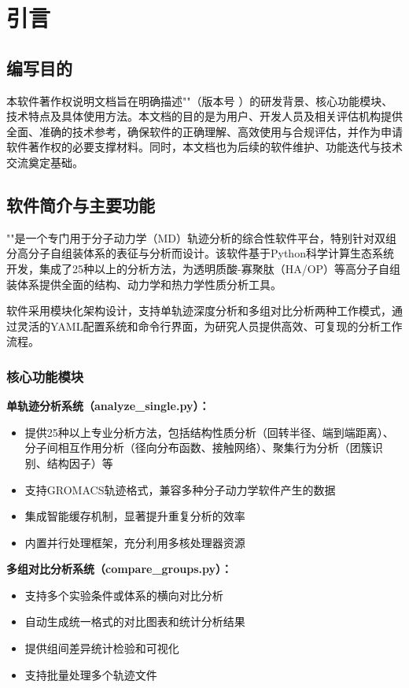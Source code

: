 
\section{引言}
\label{sec:introduction_main}

\subsection{编写目的}
\label{ssec:intro_purpose}
本软件著作权说明文档旨在明确描述"\Name"（版本号 \Version）的研发背景、核心功能模块、技术特点及具体使用方法。本文档的目的是为用户、开发人员及相关评估机构提供全面、准确的技术参考，确保软件的正确理解、高效使用与合规评估，并作为申请软件著作权的必要支撑材料。同时，本文档也为后续的软件维护、功能迭代与技术交流奠定基础。

\subsection{软件简介与主要功能}
\label{ssec:intro_summary_features}
"\Name"是一个专门用于分子动力学（MD）轨迹分析的综合性软件平台，特别针对双组分高分子自组装体系的表征与分析而设计。该软件基于Python科学计算生态系统开发，集成了25种以上的分析方法，为透明质酸-寡聚肽（HA/OP）等高分子自组装体系提供全面的结构、动力学和热力学性质分析工具。

软件采用模块化架构设计，支持单轨迹深度分析和多组对比分析两种工作模式，通过灵活的YAML配置系统和命令行界面，为研究人员提供高效、可复现的分析工作流程。

\subsubsection{核心功能模块}
\label{sssec:core_modules}

\textbf{单轨迹分析系统（analyze\_single.py）：}
\begin{itemize}
    \item 提供25种以上专业分析方法，包括结构性质分析（回转半径、端到端距离）、分子间相互作用分析（径向分布函数、接触网络）、聚集行为分析（团簇识别、结构因子）等
    \item 支持GROMACS轨迹格式，兼容多种分子动力学软件产生的数据
    \item 集成智能缓存机制，显著提升重复分析的效率
    \item 内置并行处理框架，充分利用多核处理器资源
\end{itemize}

\textbf{多组对比分析系统（compare\_groups.py）：}
\begin{itemize}
    \item 支持多个实验条件或体系的横向对比分析
    \item 自动生成统一格式的对比图表和统计分析结果
    \item 提供组间差异统计检验和可视化
    \item 支持批量处理多个轨迹文件
\end{itemize}

